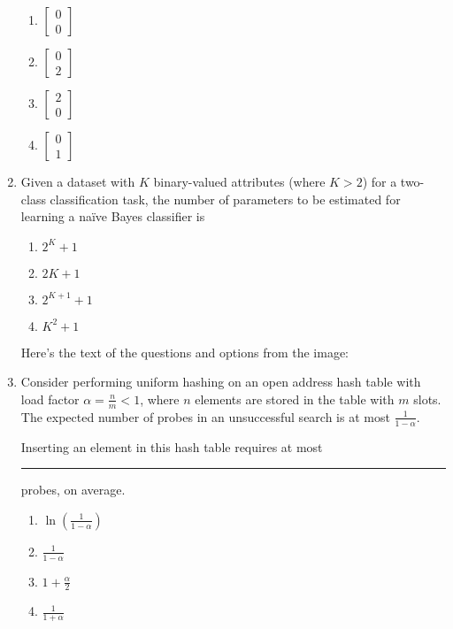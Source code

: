 \documentclass[journal,12pt,onecolumn]{IEEEtran}
\theoremstyle{remark}
\begin{document}
\begin{enumerate}
\begin{enumerate}
    \item $ \begin{bmatrix} 0 \\ 0 \end{bmatrix} $ \\
    \item $ \begin{bmatrix} 0 \\ 2 \end{bmatrix} $ \\
    \item $ \begin{bmatrix} 2 \\ 0 \end{bmatrix} $ \\
    \item $ \begin{bmatrix} 0 \\ 1 \end{bmatrix} $
\end{enumerate}

\item Given a dataset with $ K $ binary-valued attributes (where $ K > 2 $) for a two-class classification task, the number of parameters to be estimated for learning a naïve Bayes classifier is

\begin{enumerate}
    \item $ 2^K + 1 $
    \item $ 2K + 1 $
    \item $ 2^{K+1} + 1 $
    \item $ K^2 + 1 $
\end{enumerate}

Here's the text of the questions and options from the image:


\item Consider performing uniform hashing on an open address hash table with load factor $\alpha = \frac{n}{m} < 1$, where $n$ elements are stored in the table with $m$ slots. The expected number of probes in an unsuccessful search is at most $\frac{1}{1 - \alpha}$.

Inserting an element in this hash table requires at most \rule{1.5cm}{0.4pt} probes, on average.

\begin{enumerate}
    \item $\ln\left(\frac{1}{1 - \alpha}\right)$
    \item $\frac{1}{1 - \alpha}$
    \item $1 + \frac{\alpha}{2}$
    \item $\frac{1}{1 + \alpha}$
\end{enumerate}


\end{enumerate}
\end{document}
